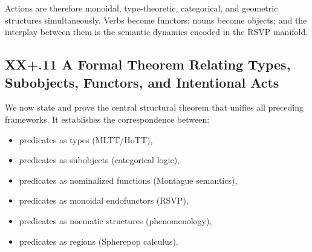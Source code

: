 \documentclass[12pt,letterpaper]{article}
\begin{document}
Actions are therefore monoidal, type-theoretic, categorical, and geometric
structures simultaneously.  Verbs become functors; nouns become objects; and the
interplay between them is the semantic dynamics encoded in the RSVP manifold.

\subsection{XX+.11 A Formal Theorem Relating Types, Subobjects, Functors, and Intentional Acts}

We now state and prove the central structural theorem that unifies all preceding
frameworks.  It establishes the correspondence between:

\begin{itemize}
    \item predicates as types (MLTT/HoTT),
    \item predicates as subobjects (categorical logic),
    \item predicates as nominalized functions (Montague semantics),
    \item predicates as monoidal endofunctors (RSVP),
    \item predicates as noematic structures (phenomenology),
    \item predicates as regions (Spherepop calculus).
\end{itemize}
\end{document}
